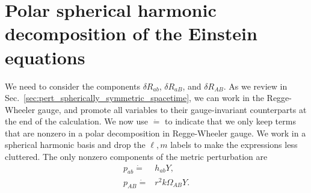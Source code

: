 \documentclass[12pt]{report}
\begin{document}
\section{Polar spherical harmonic decomposition of the Einstein equations
\label{sec:polar_decomposition_tensor_eom}}
    We need to consider the components $\delta R_{ab}$, $\delta R_{aB}$,
and $\delta R_{AB}$. 
As we review in Sec.~\ref{sec:pert_spherically_symmetric_spacetime}, 
we can work in the Regge-Wheeler
gauge, and promote all variables to their gauge-invariant
counterparts at the end of the calculation.
We now use $\dot{=}$ to indicate that we only keep terms that are nonzero
in a polar decomposition in Regge-Wheeler gauge.
We work in a spherical harmonic basis and drop the $\ell,m$ labels
to make the expressions less cluttered.
The only nonzero components of the metric perturbation are
\begin{subequations}
\begin{align}
    p_{ab}
    \dot{=}&
    h_{ab} Y 
    ,\\
    p_{AB}
    \dot{=}&
    r^2 k \Omega_{AB} Y
    .
\end{align}
\end{subequations}
\end{document}
